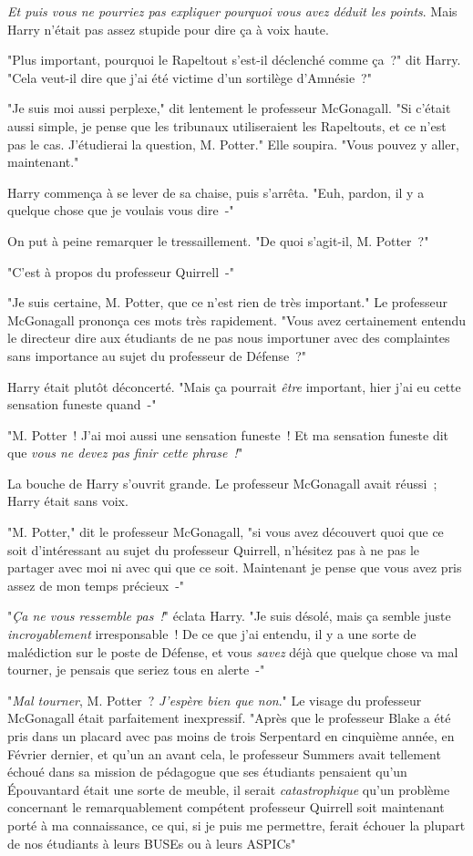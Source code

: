 \emph{Et puis vous ne pourriez pas expliquer pourquoi vous avez déduit les points}. Mais Harry n'était pas assez stupide pour dire ça à voix haute.

"Plus important, pourquoi le Rapeltout s'est-il déclenché comme ça~?" dit Harry. "Cela veut-il dire que j'ai été victime d'un sortilège d'Amnésie~?"

"Je suis moi aussi perplexe," dit lentement le professeur McGonagall. "Si c'était aussi simple, je pense que les tribunaux utiliseraient les Rapeltouts, et ce n'est pas le cas. J'étudierai la question, M. Potter." Elle soupira. "Vous pouvez y aller, maintenant."

Harry commença à se lever de sa chaise, puis s'arrêta. "Euh, pardon, il y a quelque chose que je voulais vous dire~-"

On put à peine remarquer le tressaillement. "De quoi s'agit-il, M. Potter~?"

"C'est à propos du professeur Quirrell~-"

"Je suis certaine, M. Potter, que ce n'est rien de très important." Le professeur McGonagall prononça ces mots très rapidement. "Vous avez certainement entendu le directeur dire aux étudiants de ne pas nous importuner avec des complaintes sans importance au sujet du professeur de Défense~?"

Harry était plutôt déconcerté. "Mais ça pourrait \emph{être} important, hier j'ai eu cette sensation funeste quand~-"

"M. Potter~! J'ai moi aussi une sensation funeste~! Et ma sensation funeste dit que \emph{vous ne devez pas finir cette phrase~!}"

La bouche de Harry s'ouvrit grande. Le professeur McGonagall avait réussi~; Harry était sans voix.

"M. Potter," dit le professeur McGonagall, "si vous avez découvert quoi que ce soit d'intéressant au sujet du professeur Quirrell, n'hésitez pas à ne pas le partager avec moi ni avec qui que ce soit. Maintenant je pense que vous avez pris assez de mon temps précieux~-"

"\emph{Ça ne vous ressemble pas~!}" éclata Harry. "Je suis désolé, mais ça semble juste \emph{incroyablement} irresponsable~! De ce que j'ai entendu, il y a une sorte de malédiction sur le poste de Défense, et vous \emph{savez} déjà que quelque chose va mal tourner, je pensais que seriez tous en alerte~-"

"\emph{Mal tourner}, M. Potter~? \emph{J'espère bien que non}." Le visage du professeur McGonagall était parfaitement inexpressif. "Après que le professeur Blake a été pris dans un placard avec pas moins de trois Serpentard en cinquième année, en Février dernier, et qu'un an avant cela, le professeur Summers avait tellement échoué dans sa mission de pédagogue que ses étudiants pensaient qu'un Épouvantard était une sorte de meuble, il serait \emph{catastrophique} qu'un problème concernant le remarquablement compétent professeur Quirrell soit maintenant porté à ma connaissance, ce qui, si je puis me permettre, ferait échouer la plupart de nos étudiants à leurs BUSEs ou à leurs ASPICs"

